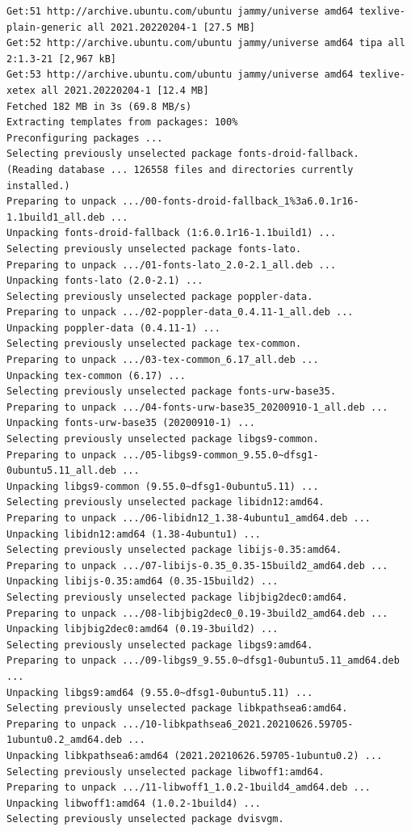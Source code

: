 \documentclass[
  11pt,
  letterpaper,
]{book}
\begin{document}
\begin{verbatim}
Get:51 http://archive.ubuntu.com/ubuntu jammy/universe amd64 texlive-plain-generic all 2021.20220204-1 [27.5 MB]
Get:52 http://archive.ubuntu.com/ubuntu jammy/universe amd64 tipa all 2:1.3-21 [2,967 kB]
Get:53 http://archive.ubuntu.com/ubuntu jammy/universe amd64 texlive-xetex all 2021.20220204-1 [12.4 MB]
Fetched 182 MB in 3s (69.8 MB/s)
Extracting templates from packages: 100%
Preconfiguring packages ...
Selecting previously unselected package fonts-droid-fallback.
(Reading database ... 126558 files and directories currently installed.)
Preparing to unpack .../00-fonts-droid-fallback_1%3a6.0.1r16-1.1build1_all.deb ...
Unpacking fonts-droid-fallback (1:6.0.1r16-1.1build1) ...
Selecting previously unselected package fonts-lato.
Preparing to unpack .../01-fonts-lato_2.0-2.1_all.deb ...
Unpacking fonts-lato (2.0-2.1) ...
Selecting previously unselected package poppler-data.
Preparing to unpack .../02-poppler-data_0.4.11-1_all.deb ...
Unpacking poppler-data (0.4.11-1) ...
Selecting previously unselected package tex-common.
Preparing to unpack .../03-tex-common_6.17_all.deb ...
Unpacking tex-common (6.17) ...
Selecting previously unselected package fonts-urw-base35.
Preparing to unpack .../04-fonts-urw-base35_20200910-1_all.deb ...
Unpacking fonts-urw-base35 (20200910-1) ...
Selecting previously unselected package libgs9-common.
Preparing to unpack .../05-libgs9-common_9.55.0~dfsg1-0ubuntu5.11_all.deb ...
Unpacking libgs9-common (9.55.0~dfsg1-0ubuntu5.11) ...
Selecting previously unselected package libidn12:amd64.
Preparing to unpack .../06-libidn12_1.38-4ubuntu1_amd64.deb ...
Unpacking libidn12:amd64 (1.38-4ubuntu1) ...
Selecting previously unselected package libijs-0.35:amd64.
Preparing to unpack .../07-libijs-0.35_0.35-15build2_amd64.deb ...
Unpacking libijs-0.35:amd64 (0.35-15build2) ...
Selecting previously unselected package libjbig2dec0:amd64.
Preparing to unpack .../08-libjbig2dec0_0.19-3build2_amd64.deb ...
Unpacking libjbig2dec0:amd64 (0.19-3build2) ...
Selecting previously unselected package libgs9:amd64.
Preparing to unpack .../09-libgs9_9.55.0~dfsg1-0ubuntu5.11_amd64.deb ...
Unpacking libgs9:amd64 (9.55.0~dfsg1-0ubuntu5.11) ...
Selecting previously unselected package libkpathsea6:amd64.
Preparing to unpack .../10-libkpathsea6_2021.20210626.59705-1ubuntu0.2_amd64.deb ...
Unpacking libkpathsea6:amd64 (2021.20210626.59705-1ubuntu0.2) ...
Selecting previously unselected package libwoff1:amd64.
Preparing to unpack .../11-libwoff1_1.0.2-1build4_amd64.deb ...
Unpacking libwoff1:amd64 (1.0.2-1build4) ...
Selecting previously unselected package dvisvgm.

\end{verbatim}
\end{document}
